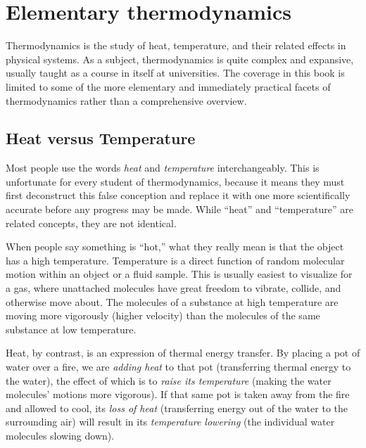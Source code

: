 
















\filbreak
\section{Elementary thermodynamics}

Thermodynamics is the study of heat, temperature, and their related effects in physical systems.  As a subject, thermodynamics is quite complex and expansive, usually taught as a course in itself at universities.  The coverage in this book is limited to some of the more elementary and immediately practical facets of thermodynamics rather than a comprehensive overview.




\filbreak
\subsection{Heat versus Temperature}

Most people use the words \textit{heat} and \textit{temperature} interchangeably.  This is unfortunate for every student of thermodynamics, because it means they must first deconstruct this false conception and replace it with one more scientifically accurate before any progress may be made.  While ``heat'' and ``temperature'' are related concepts, they are not identical.

When people say something is ``hot,'' what they really mean is that the object has a high temperature.  Temperature is a direct function of random molecular motion within an object or a fluid sample.  This is usually easiest to visualize for a gas, where unattached molecules have great freedom to vibrate, collide, and otherwise move about.  The molecules of a substance at high temperature are moving more vigorously (higher velocity) than the molecules of the same substance at low temperature.
 
Heat, by contrast, is an expression of thermal energy transfer.  By placing a pot of water over a fire, we are \textit{adding heat} to that pot (transferring thermal energy to the water), the effect of which is to \textit{raise its temperature} (making the water molecules' motions more vigorous).  If that same pot is taken away from the fire and allowed to cool, its \textit{loss of heat} (transferring energy out of the water to the surrounding air) will result in its \textit{temperature lowering} (the individual water molecules slowing down).  

